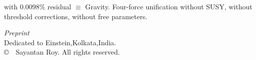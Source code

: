 \documentclass[12pt,oneside,openany]{book}
\begin{document}
\begin{titlepage}
\begin{minipage}{0.88\textwidth}
\vspace{0.3cm}
\footnotesize
with $0.0098\%$ residual $\equiv$ Gravity. Four-force unification without SUSY, without threshold corrections, without free parameters.
\end{minipage}

\vfill

\begin{minipage}{0.85\textwidth}
\centering
\footnotesize
\textit{Preprint}\\[2pt]
Dedicated to Einstein,Kolkata,India.\\[2pt]
\copyright\ \the\year\ Sayantan Roy. All rights reserved.
\end{minipage}

\vspace{0.3cm}

\end{titlepage}
\end{document}
